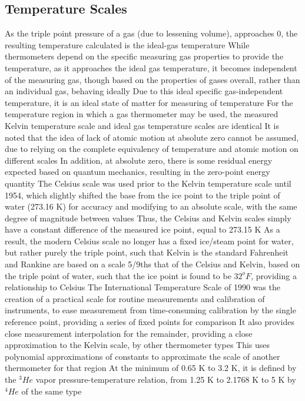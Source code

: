 \subsection{Temperature Scales}
\begin{outline*}
\1 As the triple point pressure of a gas (due to lessening volume), approaches 0, the resulting temperature calculated is the ideal-gas temperature
\2 While thermometers depend on the specific measuring gas properties to provide the temperature, as it approaches the ideal gas temperature, it becomes independent of the measuring gas, though based on the properties of gases overall, rather than an individual gas, behaving ideally
\3 Due to this ideal specific gas-independent temperature, it is an ideal state of matter for measuring of temperature
\2 For the temperature region in which a gas thermometer may be used, the measured Kelvin temperature scale and ideal gas temperature scales are identical
\2 It is noted that the idea of lack of atomic motion at absolute zero cannot be assumed, due to relying on the complete equivalency of temperature and atomic motion on different scales 
\3 In addition, at absolute zero, there is some residual energy expected based on quantum mechanics, resulting in the zero-point energy quantity
\1 The Celsius scale was used prior to the Kelvin temperature scale until 1954, which slightly shifted the base from the ice point to the triple point of water (273.16 K) for accuracy and modifying to an absolute scale, with the same degree of magnitude between values
\2 Thus, the Celsius and Kelvin scales simply have a constant difference of the measured ice point, equal to 273.15 K
\2 As a result, the modern Celsius scale no longer has a fixed ice/steam point for water, but rather purely the triple point, such that Kelvin is the standard
\1 Fahrenheit and Rankine are based on a scale 5/9ths that of the Celsius and Kelvin, based on the triple point of water, such that the ice point is found to be $32^o F$, providing a relationship to Celsius
\1 The International Temperature Scale of 1990 was the creation of a practical scale for routine measurements and calibration of instruments, to ease measurement from time-consuming calibration by the single reference point,  providing a series of fixed points for comparison
\2 It also provides close measurement interpolation for the remainder, providing a close approximation to the Kelvin scale, by other thermometer types
\3 This uses polynomial approximations of constants to approximate the scale of another thermometer for that region
\2 At the minimum of 0.65 K to 3.2 K, it is defined by the $^3He$ vapor pressure-temperature relation, from 1.25 K to 2.1768 K to 5 K by $^4He$ of the same type

\end{outline*}
